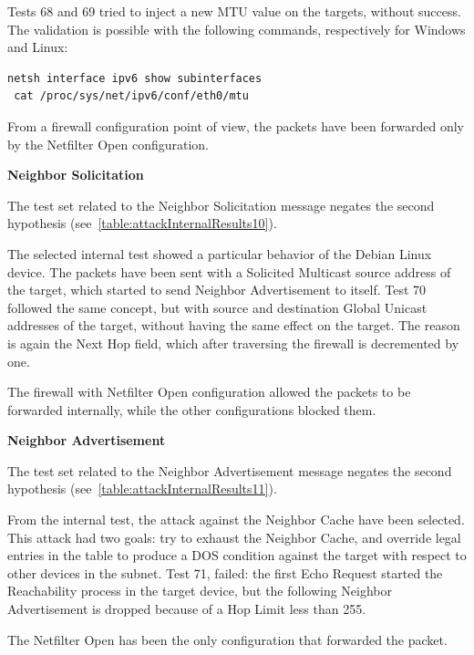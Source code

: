 \documentclass[12pt]{article}
\begin{document}
Tests 68 and 69 tried to inject a new MTU value on the targets, without success. The validation is possible with the following commands, respectively for Windows and Linux:
\begin{lstlisting}[style=python,basicstyle=\ttfamily\small]
 netsh interface ipv6 show subinterfaces
 cat /proc/sys/net/ipv6/conf/eth0/mtu
\end{lstlisting}
\vspace{-15pt}
From a firewall configuration point of view, the packets have been forwarded only by the Netfilter Open configuration.

\textbf{Neighbor Solicitation}

The test set related to the Neighbor Solicitation message negates the second hypothesis (see~\cref{table:attackInternalResults10}).

The selected internal test showed a particular behavior of the Debian Linux device. The packets have been sent with a Solicited Multicast source address of the target, which started to send Neighbor Advertisement to itself. Test 70 followed the same concept, but with source and destination Global Unicast addresses of the target, without having the same effect on the target. The reason is again the Next Hop field, which after traversing the firewall is decremented by one.

The firewall with Netfilter Open configuration allowed the packets to be forwarded internally, while the other configurations blocked them.

\textbf{Neighbor Advertisement}

The test set related to the Neighbor Advertisement message negates the second hypothesis (see~\cref{table:attackInternalResults11}).

From the internal test, the attack against the Neighbor Cache have been selected. This attack had two goals: try to exhaust the Neighbor Cache, and override legal entries in the table to produce a DOS condition against the target with respect to other devices in the subnet. Test 71, failed: the first Echo Request started the Reachability process in the target device, but the following Neighbor Advertisement is dropped because of a Hop Limit less than 255.

The Netfilter Open has been the only configuration that forwarded the packet.
\end{document}

